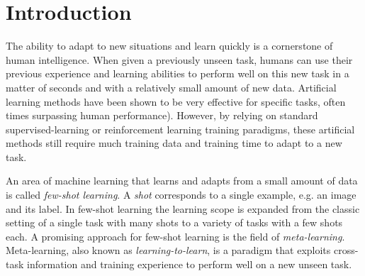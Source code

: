 
\vspace{-2em}

\section{Introduction}
The ability to adapt to new situations and learn quickly is a cornerstone of human intelligence. When given a previously unseen task, humans can use their previous experience and learning abilities to perform well on this new task in a matter of seconds and with a relatively small amount of new data. Artificial learning methods have been shown to be very effective for specific tasks, often times surpassing human performance\supercite{alphago,dermato}). However, by relying on standard supervised-learning or reinforcement learning training paradigms, these artificial methods still require much training data and training time to adapt to a new task.

An area of machine learning that learns and adapts from a small amount of data is called \textit{few-shot learning}\supercite{fei2006one}. A \textit{shot} corresponds to a single example, e.g. an image and its label. In few-shot learning the learning scope is expanded from the classic setting of a single task with many shots to a variety of tasks with a few shots each. A promising approach for few-shot learning is the field of \textit{meta-learning}. Meta-learning, also known as \textit{learning-to-learn}, is a paradigm that exploits cross-task information and training experience to perform well on a new unseen task.

